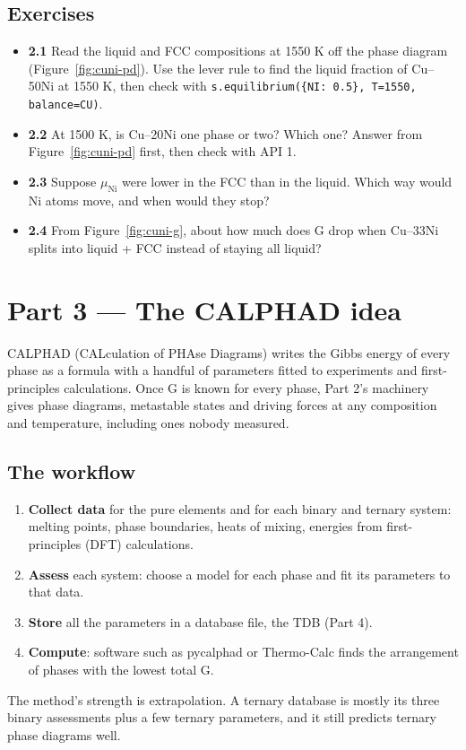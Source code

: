 \documentclass[12pt,a4paper]{article}
\begin{document}
\subsection*{Exercises}
\begin{itemize}
\item \textbf{2.1} Read the liquid and FCC compositions at 1550 K off the phase diagram (Figure~\ref{fig:cuni-pd}). Use the lever rule to find the liquid fraction of Cu--50Ni at 1550 K, then check with \texttt{s.\allowbreak{}equilibrium(\{\textquotedbl{}NI\textquotedbl{}: 0.\allowbreak{}5\},\allowbreak{} T=1550,\allowbreak{} balance=\textquotedbl{}CU\textquotedbl{})}.
\item \textbf{2.2} At 1500 K, is Cu--20Ni one phase or two? Which one? Answer from Figure~\ref{fig:cuni-pd} first, then check with API 1.
\item \textbf{2.3} Suppose \(\mu_{\mathrm{Ni}}\) were lower in the FCC than in the liquid. Which way would Ni atoms move, and when would they stop?
\item \textbf{2.4} From Figure~\ref{fig:cuni-g}, about how much does G drop when Cu--33Ni splits into liquid + FCC instead of staying all liquid?
\end{itemize}

\section*{Part 3 --- The CALPHAD idea}
CALPHAD (CALculation of PHAse Diagrams) writes the Gibbs energy of every phase as a formula with a handful of parameters fitted to experiments and first-principles calculations. Once G is known for every phase, Part 2's machinery gives phase diagrams, metastable states and driving forces at any composition and temperature, including ones nobody measured.


\subsection*{The workflow}
\begin{enumerate}
\item \textbf{Collect data} for the pure elements and for each binary and ternary system: melting points, phase boundaries, heats of mixing, energies from first-principles (DFT) calculations.
\item \textbf{Assess} each system: choose a model for each phase and fit its parameters to that data.
\item \textbf{Store} all the parameters in a database file, the TDB (Part 4).
\item \textbf{Compute}: software such as pycalphad or Thermo-Calc finds the arrangement of phases with the lowest total G.
\end{enumerate}
The method's strength is extrapolation. A ternary database is mostly its three binary assessments plus a few ternary parameters, and it still predicts ternary phase diagrams well.
\end{document}
